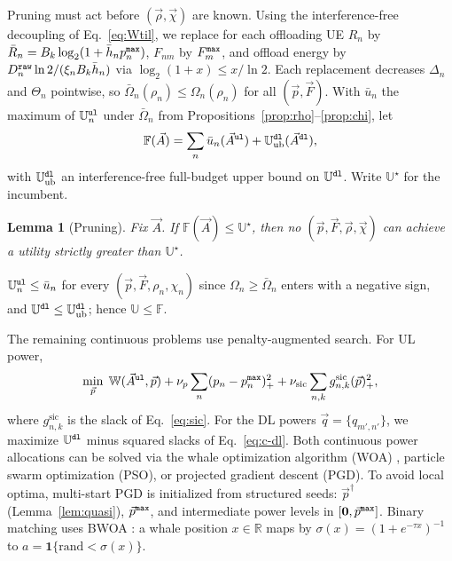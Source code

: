 \documentclass[journal]{IEEEtran}
\newtheorem{lemma}{Lemma}
\begin{document}
{Pruning must act before $(\vec{\rho},\vec{\chi})$ are known. Using the interference-free decoupling of Eq.~\eqref{eq:Wtil}, we replace for each offloading UE $R_n$ by $\bar R_n=B_k\log_2(1+\bar h_np_n^{\tt max})$, $F_{nm}$ by $F_m^{\tt max}$, and offload energy by $D_n^{\tt raw}\ln2/(\xi_nB_k\bar h_n)$ via $\log_2(1+x)\le x/\ln2$. Each replacement decreases $\Delta_n$ and $\Theta_n$ pointwise, so $\bar\Omega_n(\rho_n)\le\Omega_n(\rho_n)$ for all $(\vec{p},\vec{F})$. With $\bar u_n$ the maximum of $\mathbb{U}_n^{\tt ul}$ under $\bar\Omega_n$ from Propositions~\ref{prop:rho}--\ref{prop:chi}, let}
\begin{equation}
\mathbb{F}(\vec{A})=\sum_{n}\bar u_n(\vec{A}^{\tt ul})+\mathbb{U}^{\tt dl}_{\mathrm{ub}}(\vec{A}^{\tt dl}),
\label{eq:Fbound}
\end{equation}
{with $\mathbb{U}^{\tt dl}_{\mathrm{ub}}$ an interference-free full-budget upper bound on $\mathbb{U}^{\tt dl}$. Write $\mathbb{U}^\star$ for the incumbent.}

\begin{lemma}[Pruning]\label{lem:prune}
{Fix $\vec{A}$. If $\mathbb{F}(\vec{A})\le\mathbb{U}^\star$, then no $(\vec{p},\vec{F},\vec{\rho},\vec{\chi})$ can achieve a utility strictly greater than $\mathbb{U}^\star$.}
\end{lemma}
\begin{IEEEproof}
$\mathbb{U}_n^{\tt ul}\le\bar u_n$ for every $(\vec{p},\vec{F},\rho_n,\chi_n)$ since $\Omega_n\ge\bar\Omega_n$ enters with a negative sign, and $\mathbb{U}^{\tt dl}\le\mathbb{U}^{\tt dl}_{\mathrm{ub}}$; hence $\mathbb{U}\le\mathbb{F}$.
\end{IEEEproof}

The remaining continuous problems use penalty-augmented search. For UL power,
\begin{equation}
\min_{\vec{p}}\;
\mathbb{W}(\vec{A}^{\tt ul},\vec{p})
+\nu_p\sum_n(p_n-p_n^{\tt max})_+^2
+\nu_{\mathrm{sic}}\sum_{n,k}g_{n,k}^{\mathrm{sic}}(\vec{p})_+^2,
\label{eq:mpc}
\end{equation}
where $g_{n,k}^{\mathrm{sic}}$ is the slack of Eq.~\eqref{eq:sic}. For the DL powers $\vec{q}=\{q_{m',n'}\}$, we maximize $\mathbb{U}^{\tt dl}$ minus squared slacks of Eq.~\eqref{eq:c-dl}. 
{Both continuous power allocations can be solved via the whale optimization algorithm (WOA) \cite{mirjalili2016whale}, particle swarm optimization (PSO), or projected gradient descent (PGD). To avoid local optima, multi-start PGD is initialized from structured seeds: $\vec{p}^\dagger$ (Lemma~\ref{lem:quasi}), $\vec{p}^{\tt max}$, and intermediate power levels in $[\mathbf{0}, \vec{p}^{\tt max}]$.} 
Binary matching uses BWOA \cite{kumar2020binary}: a whale position $x\in\mathbb{R}$ maps by $\sigma(x)=(1+e^{-\tau x})^{-1}$ to $a=\mathbf{1}\{\mathrm{rand}<\sigma(x)\}$.
\end{document}
